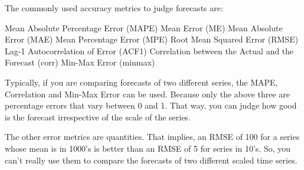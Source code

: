 The commonly used accuracy metrics to judge forecasts are:

Mean Absolute Percentage Error (MAPE) Mean Error (ME) Mean Absolute
Error (MAE) Mean Percentage Error (MPE) Root Mean Squared Error (RMSE)
Lag-1 Autocorrelation of Error (ACF1) Correlation between the Actual and
the Forecast (corr) Min-Max Error (minmax)

Typically, if you are comparing forecasts of two different series, the
MAPE, Correlation and Min-Max Error can be used. Because only the above
three are percentage errors that vary between 0 and 1. That way, you can
judge how good is the forecast irrespective of the scale of the series.

The other error metrics are quantities. That implies, an RMSE of 100 for
a series whose mean is in 1000's is better than an RMSE of 5 for series
in 10's. So, you can't really use them to compare the forecasts of two
different scaled time series.

